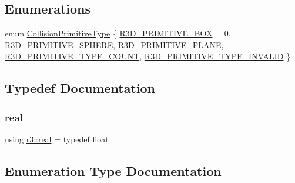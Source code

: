 \subsection*{Enumerations}
\begin{DoxyCompactItemize}
\item 
enum \mbox{\hyperlink{namespacer3_a7079ec5e42c1a55140d3bc093d49e319}{Collision\+Primitive\+Type}} \{ \newline
\mbox{\hyperlink{namespacer3_a7079ec5e42c1a55140d3bc093d49e319ab0db447fd7b2de84191d8b29231a2103}{R3\+D\+\_\+\+P\+R\+I\+M\+I\+T\+I\+V\+E\+\_\+\+B\+OX}} = 0, 
\mbox{\hyperlink{namespacer3_a7079ec5e42c1a55140d3bc093d49e319a287c9eb57336315360581fa6312676b5}{R3\+D\+\_\+\+P\+R\+I\+M\+I\+T\+I\+V\+E\+\_\+\+S\+P\+H\+E\+RE}}, 
\mbox{\hyperlink{namespacer3_a7079ec5e42c1a55140d3bc093d49e319a985a46f234b04b101f07474c97709be7}{R3\+D\+\_\+\+P\+R\+I\+M\+I\+T\+I\+V\+E\+\_\+\+P\+L\+A\+NE}}, 
\mbox{\hyperlink{namespacer3_a7079ec5e42c1a55140d3bc093d49e319aab4ac7e02ac0e76beed256986ef52cea}{R3\+D\+\_\+\+P\+R\+I\+M\+I\+T\+I\+V\+E\+\_\+\+T\+Y\+P\+E\+\_\+\+C\+O\+U\+NT}}, 
\newline
\mbox{\hyperlink{namespacer3_a7079ec5e42c1a55140d3bc093d49e319af4fa492ea93899254dd76639bbc4f30a}{R3\+D\+\_\+\+P\+R\+I\+M\+I\+T\+I\+V\+E\+\_\+\+T\+Y\+P\+E\+\_\+\+I\+N\+V\+A\+L\+ID}}
 \}
\end{DoxyCompactItemize}


\subsection{Typedef Documentation}
\mbox{\label{namespacer3_ab2016b3e3f743fb735afce242f0dc1eb}} 
\subsubsection{\texorpdfstring{real}{real}}
{\footnotesize\ttfamily using \mbox{\hyperlink{namespacer3_ab2016b3e3f743fb735afce242f0dc1eb}{r3\+::real}} = typedef float}



\subsection{Enumeration Type Documentation}
\mbox{\label{namespacer3_a7079ec5e42c1a55140d3bc093d49e319}} 
